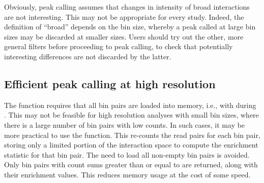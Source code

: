 \documentclass{report}\usepackage[]{graphicx}\usepackage[usenames,dvipsnames]{color}
\newcommand{\hlnum}[1]{\textcolor[rgb]{0.816,0.125,0.439}{#1}}%
\newcommand{\hlstr}[1]{\textcolor[rgb]{0.251,0.627,0.251}{#1}}%
\newcommand{\hlcom}[1]{\textcolor[rgb]{0.502,0.502,0.502}{\textit{#1}}}%
\newcommand{\hlopt}[1]{\textcolor[rgb]{0,0,0}{#1}}%
\newcommand{\hlstd}[1]{\textcolor[rgb]{0.251,0.251,0.251}{#1}}%
\newcommand{\hlkwb}[1]{\textcolor[rgb]{0,0,0}{#1}}%
\newcommand{\hlkwc}[1]{\textcolor[rgb]{0.251,0.251,0.251}{#1}}%
\newcommand{\hlkwd}[1]{\textcolor[rgb]{0.878,0.439,0.125}{#1}}%
\newenvironment{knitrout}{}{} %
\begin{document}
\begin{knitrout}
\color{fgcolor}
\end{knitrout}

Obviously, peak calling assumes that changes in intensity of broad interactions are not interesting.
This may not be appropriate for every study.
Indeed, the definition of ``broad'' depends on the bin size, whereby a peak called at large bin sizes may be discarded at smaller sizes.
Users should try out the other, more general filters before proceeding to peak calling, to check that potentially interesting differences are not discarded by the latter.

\subsection{Efficient peak calling at high resolution}
The  function requires that all bin pairs are loaded into memory, i.e., with  during .
This may not be feasible for high resolution analyses with small bin sizes, where there is a large number of bin pairs with low counts.
In such cases, it may be more practical to use the  function.
This re-counts the read pairs for each bin pair, storing only a limited portion of the interaction space to compute the enrichment statistic for that bin pair.
The need to load all non-empty bin pairs is avoided.
Only bin pairs with count sums greater than or equal to  are returned, along with their enrichment values.
This reduces memory usage at the cost of some speed.
\end{document}

